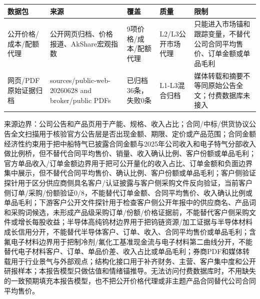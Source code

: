 \begin{exhibitbox}[结构化数据源健康（8）]
\scriptsize
\begin{tabularx}{\exhibitboxwidth}{L{2.1cm} L{2.4cm} L{2.4cm} L{1.5cm} X}
\toprule
\textbf{数据包} & \textbf{来源} & \textbf{覆盖} & \textbf{质量} & \textbf{限制} \\
\midrule
公开价格/成本/配额代理 & 公开网页归档、价格报道、AkShare宏观指数 & 9项价格/成本/配额代理 & L2/L3公开市场代理 & 只能进入市场锚和跟踪变量，不替代公司合同平均售价、订单金额或单品毛利 \\
网页/PDF原始证据归档 & sources/public-web-20260628 and broker/public PDFs & 已归档36条，失败0条 & L1-L3混合归档 & 媒体转载和摘要不等同原始公告全文；付费数据库未接入 \\
\bottomrule
\end{tabularx}
\end{exhibitbox}

来源边界：公司公告和产品页用于产能、规格、收入占比；合同/中标/供货协议公告全文扫描用于核验官方公告层是否出现金额、期限、定价或产品范围；合同金额经济性约束用于把中船特气已披露合同金额与2025年公司收入和电子特气分部收入做比例桥，但不替代合同平均售价、销量、收入确认比例、客户份额或单品毛利；官方单品收入/订单金额边界用于把可公开量化的收入占比、订单金额和负面边界集中展示，但不替代合同平均售价、确认比例、客户份额或单品毛利；客户侧验证探针用于区分供应商侧具名客户/认证披露与客户侧采购文件反向验证，当前客户侧订单/采购/份额验证0/8，不能替代订单金额、合同平均售价、收入确认比例或单品毛利；下游客户公开文件探针用于检查客户侧公开年报中的供应商名、产品词和采购词候选，未形成产品级采购订单/份额/价格证据前，不能替代客户侧采购文件或增长每股收益；半导体高纯钨材边界用于把钨链资源/加工证据与半导体材料成长信用分开，不能替代半导体客户、订单、收入、合同平均售价或单品毛利；含氟电子材料边界用于把制冷剂/氟化工基准现金流与电子材料第二曲线分开，不能替代电子材料客户、订单、单品价差、收入占比或单品毛利；券商PDF和媒体转载用于行业景气与外部观点；结构化接口用于补齐财务、主营、客户集中度和公开研报样本；本报告模型只做估值和情绪锚推导。无法访问付费数据库时，不用缺失的一致预期填充本报告模型，也不把公开价格代理或非主题产品合同替代公司合同平均售价。
